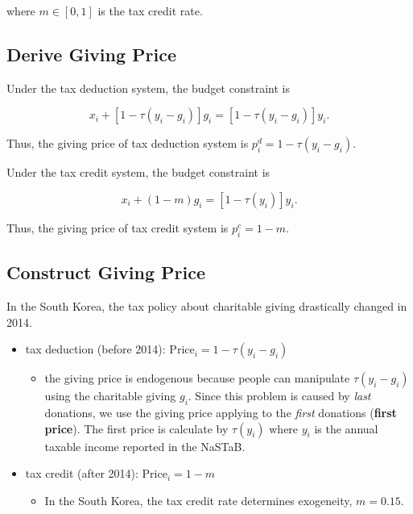 \documentclass[ review  , 3p ]{elsarticle}
\providecommand{\tightlist}{%
  \setlength{\itemsep}{0pt}\setlength{\parskip}{0pt}}
\begin{document}
  where \(m \in [0, 1]\) is the tax credit rate.

  \hypertarget{derive-giving-price}{%
  \subsection{Derive Giving Price}\label{derive-giving-price}}

  Under the tax deduction system, the budget constraint is

  \[
      x_i + [1 - \tau(y_i - g_i)]g_i = [1 - \tau(y_i - g_i)] y_i.
  \]

  Thus, the giving price of tax deduction system is \(p_i^{d} = 1 - \tau(y_i - g_i)\).

  Under the tax credit system, the budget constraint is

  \[
      x_i + (1 - m) g_i = [1 - \tau(y_i)] y_i.
  \]

  Thus, the giving price of tax credit system is \(p_i^c = 1 - m\).

  \hypertarget{construct-giving-price}{%
  \subsection{Construct Giving Price}\label{construct-giving-price}}

  In the South Korea, the tax policy about charitable giving drastically changed in 2014.

  \begin{itemize}
  \tightlist
  \item
    tax deduction (before 2014): \(\text{Price}_i = 1 - \tau(y_i - g_i)\)

    \begin{itemize}
    \tightlist
    \item
      the giving price is endogenous because people can manipulate \(\tau(y_i - g_i)\) using the charitable giving \(g_i\). Since this problem is caused by \emph{last} donations, we use the giving price applying to the \emph{first} donations (\textbf{first price}). The first price is calculate by \(\tau(y_i)\) where \(y_i\) is the annual taxable income reported in the NaSTaB.
    \end{itemize}
  \item
    tax credit (after 2014): \(\text{Price}_i = 1 - m\)

    \begin{itemize}
    \tightlist
    \item
      In the South Korea, the tax credit rate determines exogeneity, \(m = 0.15\).
    \end{itemize}
  \end{itemize}
\end{document}
